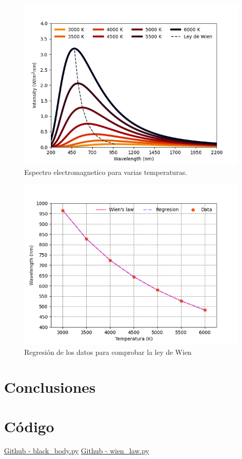 \documentclass[12pt,letterpaper]{article}
\begin{document}
\begin{multicols}{2}
\begin{figure}[H]
\includegraphics[scale=0.45]{../Graphics/black_body.png}
\caption{Espectro electromagnetico para varias temperaturas.}
\end{figure}
\begin{figure}[H]
\includegraphics[scale=0.45]{../Graphics/wien_law.png}
\caption{Regresión de los datos para comprobar la ley de Wien}
\label{wienfig}
\end{figure}
\section*{Conclusiones}


\nocite{*}
\section*{Código}
\href{https://github.com/giovannilopez9808/Notas_Agosto_2020/blob/master/AMC/Reto1/black_body.py}{Github - black\_body.py}
\href{https://github.com/giovannilopez9808/Notas_Agosto_2020/blob/master/AMC/Reto1/wien_law.py}{Github - wien\_law.py}
\end{multicols}
\end{document}

